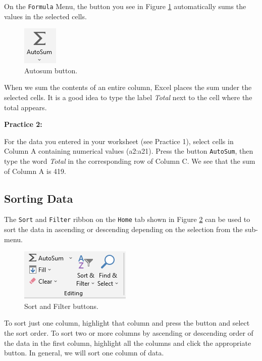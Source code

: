 \documentclass[
]{book}
\begin{document}
On the \texttt{Formula} Menu, the button you see in Figure \ref{fig:autosum} automatically sums the values in the selected cells.

\begin{figure}

{\centering \includegraphics[width=0.1\linewidth]{autosum} 

}

\caption{Autosum button.}\label{fig:autosum}
\end{figure}

When we sum the contents of an entire column, Excel places the sum under the selected cells. It is a good idea to type the label \emph{Total} next to the cell where the total appears.

\textbf{Practice 2:}

For the data you entered in your worksheet (see Practice 1), select cells in Column A containing numerical values (a2:a21). Press the button \texttt{AutoSum}, then type the word \emph{Total} in the corresponding row of Column C. We see that the sum of Column A is 419.

\hypertarget{sorting-data}{%
\subsection{Sorting Data}\label{sorting-data}}

The \texttt{Sort} and \texttt{Filter} ribbon on the \texttt{Home} tab shown in Figure \ref{fig:sorting} can be used to sort the data in ascending or descending depending on the selection from the sub-menu.

\begin{figure}

{\centering \includegraphics[width=0.3\linewidth]{sorting} 

}

\caption{Sort and Filter buttons.}\label{fig:sorting}
\end{figure}

To sort just one column, highlight that column and press the button and select the sort order. To sort two or more columns by ascending or descending order of the data in the first column, highlight all the columns and click the appropriate button. In general, we will sort one column of data.
\end{document}
